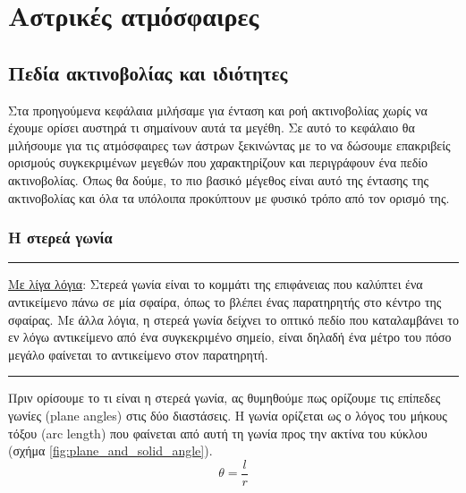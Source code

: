 \chapter{Αστρικές ατμόσφαιρες}
\label{ch:Chapter4}
{\hypersetup{linkcolor=black, pdfborder=0 0 1}
	\minitoc
}

\section{Πεδία ακτινοβολίας και ιδιότητες}
Στα προηγούμενα κεφάλαια μιλήσαμε για ένταση και ροή ακτινοβολίας χωρίς να έχουμε ορίσει αυστηρά τι σημαίνουν αυτά τα μεγέθη. Σε αυτό το κεφάλαιο θα μιλήσουμε για τις ατμόσφαιρες των άστρων ξεκινώντας με το να δώσουμε επακριβείς ορισμούς συγκεκριμένων μεγεθών που χαρακτηρίζουν και περιγράφουν ένα πεδίο ακτινοβολίας. Όπως θα δούμε, το πιο βασικό μέγεθος είναι αυτό της έντασης της ακτινοβολίας και όλα τα υπόλοιπα προκύπτουν με φυσικό τρόπο από τον ορισμό της.

\subsection{Η στερεά γωνία}
{\color{red} \hrule}
\underline{Με λίγα λόγια}:
Στερεά γωνία είναι το κομμάτι της επιφάνειας που καλύπτει ένα αντικείμενο πάνω σε μία σφαίρα, όπως το βλέπει ένας παρατηρητής στο κέντρο της σφαίρας. Με άλλα λόγια, η στερεά γωνία δείχνει το οπτικό πεδίο που καταλαμβάνει το εν λόγω αντικείμενο από ένα συγκεκριμένο σημείο, είναι δηλαδή ένα μέτρο του πόσο μεγάλο φαίνεται το αντικείμενο στον παρατηρητή.\\
 {\color{red} \hrule}
Πριν ορίσουμε το τι είναι η στερεά γωνία, ας θυμηθούμε πως ορίζουμε τις επίπεδες γωνίες (plane angles) στις δύο διαστάσεις. Η γωνία ορίζεται ως ο λόγος του μήκους τόξου (arc length) που φαίνεται από αυτή τη γωνία προς την ακτίνα του κύκλου (σχήμα \ref{fig:plane_and_solid_angle}). 
\begin{equation}
\label{eq:plane_angle}
    \theta = \frac{l}{r}
\end{equation}

